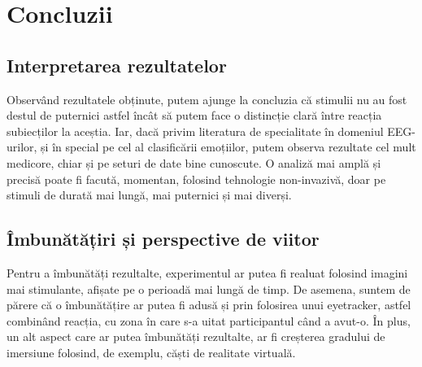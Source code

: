 \chapter{Concluzii}

\section{Interpretarea rezultatelor}

Observând rezultatele obținute, putem ajunge la concluzia că stimulii nu au fost destul de puternici astfel încât să putem face o distincție clară între reacția subiecților la aceștia. Iar, dacă privim literatura de specialitate în domeniul EEG-urilor, și în special pe cel al clasificării emoțiilor, putem observa rezultate cel mult medicore\cite{recreation_attempt}, chiar și pe seturi de date bine cunoscute. O analiză mai amplă și precisă poate fi facută, momentan, folosind tehnologie non-invazivă, doar pe stimuli de durată mai lungă, mai puternici și mai diverși. 

\section{Îmbunătățiri și perspective de viitor}

Pentru a îmbunătăți rezultalte, experimentul ar putea fi realuat folosind imagini mai stimulante, afișate pe o perioadă mai lungă de timp. De asemena, suntem de părere că o îmbunătățire ar putea fi adusă și prin folosirea unui eyetracker, astfel combinând reacția, cu zona în care s-a uitat participantul când a avut-o. În plus, un alt aspect care ar putea îmbunătăți rezultalte, ar fi creșterea gradului de imersiune folosind, de exemplu, căști de realitate virtuală.